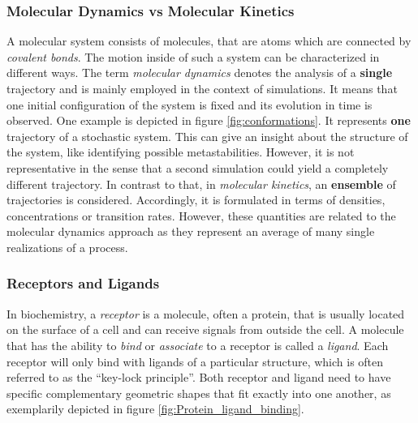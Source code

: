 \subsubsection*{Molecular Dynamics vs Molecular Kinetics}
A molecular system consists of molecules, that are atoms which are connected by \textit{covalent bonds}.
The motion inside of such a system can be characterized in different ways.
The term \textit{molecular dynamics} denotes the analysis of a \textbf{single} trajectory and is mainly employed in the context of simulations. 
It means that one initial configuration of the system is fixed and its evolution in time is observed. One example is depicted in figure \ref{fig:conformations}.
It represents \textbf{one} trajectory of a stochastic system. This can give an insight about the structure of the system, like identifying possible metastabilities. However, it is not representative in the sense that a second simulation could yield a completely different trajectory.
In contrast to that, in \textit{molecular kinetics}, an \textbf{ensemble} of trajectories is considered.
Accordingly, it is formulated in terms of densities, concentrations or transition rates.
However, these quantities are related to the molecular dynamics approach as they represent an average of many single realizations of a process.


\subsubsection*{Receptors and Ligands} 

In biochemistry, a \textit{receptor} is a molecule, often a protein, that is usually located on the surface of a cell and can receive signals from outside the cell.
A molecule that has the ability to \textit{bind} or \textit{associate} to a receptor is called a \textit{ligand}.
Each receptor will only bind with ligands of a particular structure, which is often referred to as the ``key-lock principle''.
Both receptor and ligand need to have specific complementary geometric shapes that fit exactly into one another, as exemplarily depicted in figure \ref{fig:Protein_ligand_binding}.

